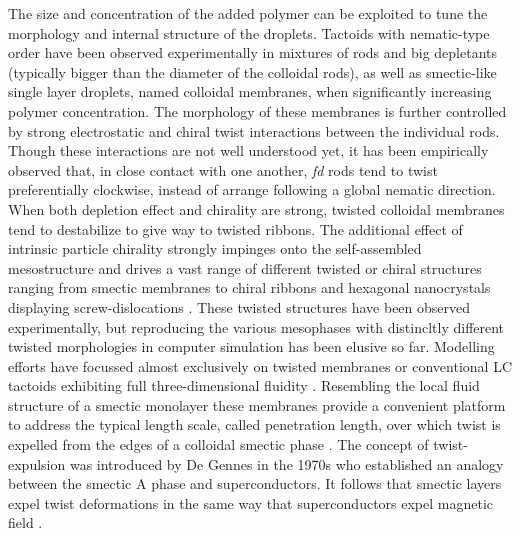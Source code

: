  The size and concentration of the added polymer can be exploited to  tune the morphology and internal structure of the droplets. Tactoids with nematic-type order have been observed experimentally in mixtures of rods and big depletants (typically bigger than the diameter of the colloidal rods), as well as smectic-like single layer droplets, named colloidal membranes, when significantly increasing polymer concentration. The morphology of these membranes is further controlled by strong electrostatic and chiral twist interactions between the individual rods. Though these interactions are not well understood yet, it has been empirically observed that, in close contact with one another, {\em fd} rods tend to twist preferentially clockwise, instead of arrange following a global nematic direction. When both depletion effect and chirality are strong, twisted colloidal membranes tend to destabilize to give way to twisted ribbons. The additional effect of intrinsic particle chirality
strongly impinges  onto the self-assembled mesostructure and drives a vast range of different twisted or chiral structures ranging from smectic membranes to chiral ribbons  \cite{Gibaud2014} and hexagonal nanocrystals displaying screw-dislocations \cite{grelet1}. These twisted structures have been observed experimentally, but reproducing the various mesophases with distincltly different twisted morphologies in computer simulation has been elusive so far.  Modelling efforts have focussed almost exclusively on twisted membranes \cite{kang_sm2016,wensink2018elastic,kuhnhold2022colloidal} or conventional LC tactoids exhibiting full three-dimensional fluidity \cite{prinsen2003shape,prinsen2004parity,kuhnhold2022structure}. Resembling the local fluid structure of a smectic monolayer these membranes  provide a convenient platform  to address the typical length scale, called penetration length, over which twist is expelled from the edges of a colloidal smectic phase \cite{barry2009direct}. The concept of twist-expulsion was introduced by De Gennes in the 1970s who established an analogy between the smectic A phase and superconductors. It follows that smectic layers expel twist deformations in the same way that superconductors expel magnetic field \cite{gennes-prost}.



